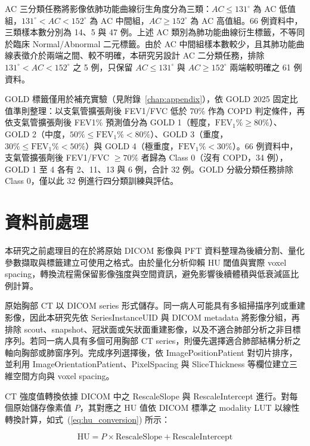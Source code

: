\begin{ZhChapter}
AC 三分類任務將影像依肺功能曲線衍生角度分為三類：$AC \leq 131^{\circ}$ 為 AC 低值組，$131^{\circ} < AC < 152^{\circ}$ 為 AC 中間組，$AC \geq 152^{\circ}$ 為 AC 高值組。66 例資料中，三類樣本數分別為 14、5 與 47 例。上述 AC 類別為肺功能曲線衍生標籤，不等同於臨床 Normal/Abnormal 二元標籤。由於 AC 中間組樣本數較少，且其肺功能曲線表徵介於兩端之間、較不明確，本研究另設計 AC 二分類任務，排除 $131^{\circ} < AC < 152^{\circ}$ 之 5 例，只保留 $AC \leq 131^{\circ}$ 與 $AC \geq 152^{\circ}$ 兩端較明確之 61 例資料。

GOLD 標籤僅用於補充實驗（見附錄~\ref{chap:appendix}），依 GOLD 2025 固定比值準則整理\cite{gold2025}：以支氣管擴張劑後 FEV1/FVC 低於 70\% 作為 COPD 判定條件，再依支氣管擴張劑後 FEV1\% 預測值分為 GOLD 1（輕度，$\mathrm{FEV_1\%} \geq 80\%$）、GOLD 2（中度，$50\% \leq \mathrm{FEV_1\%} < 80\%$）、GOLD 3（重度，$30\% \leq \mathrm{FEV_1\%} < 50\%$）與 GOLD 4（極重度，$\mathrm{FEV_1\%} < 30\%$）。66 例資料中，支氣管擴張劑後 FEV1/FVC $\geq 70\%$ 者歸為 Class 0（沒有 COPD，34 例），GOLD 1 至 4 各有 2、11、13 與 6 例，合計 32 例。GOLD 分級分類任務排除 Class 0，僅以此 32 例進行四分類訓練與評估。

\section{資料前處理}

本研究之前處理目的在於將原始 DICOM 影像與 PFT 資料整理為後續分割、量化參數擷取與標籤建立可使用之格式。由於量化分析仰賴 HU 閾值與實際 voxel spacing，轉換流程需保留影像強度與空間資訊，避免影響後續體積與低衰減區比例計算。

原始胸部 CT 以 DICOM series 形式儲存。同一病人可能具有多組掃描序列或重建影像，因此本研究先依 SeriesInstanceUID 與 DICOM metadata 將影像分組，再排除 scout、snapshot、冠狀面或矢狀面重建影像，以及不適合肺部分析之非目標序列。若同一病人具有多個可用胸部 CT series，則優先選擇適合肺部結構分析之軸向胸部或肺窗序列。完成序列選擇後，依 ImagePositionPatient 對切片排序，並利用 ImageOrientationPatient、PixelSpacing 與 SliceThickness 等欄位建立三維空間方向與 voxel spacing。

CT 強度值轉換依據 DICOM 中之 RescaleSlope 與 RescaleIntercept 進行。對每個原始儲存像素值 $P$，其對應之 HU 值依 DICOM 標準之 modality LUT 以線性轉換計算\cite{nema2024dicom}，如式~(\ref{eq:hu_conversion}) 所示：

\begin{equation}
\label{eq:hu_conversion}
\mathrm{HU} = P \times \mathrm{RescaleSlope} + \mathrm{RescaleIntercept}
\end{equation}


\end{ZhChapter}
